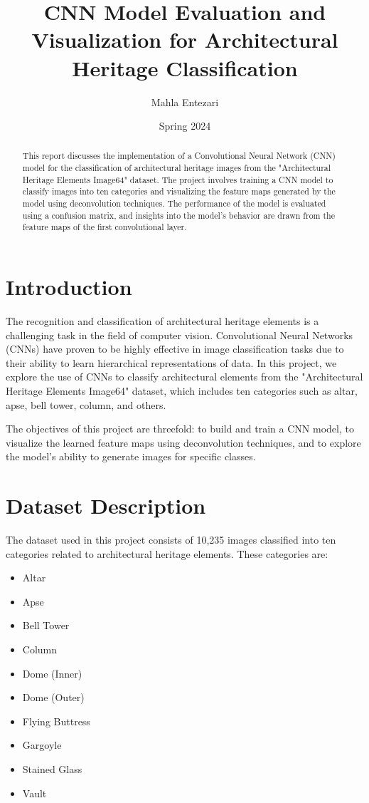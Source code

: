 \documentclass[12pt]{article}
\title{CNN Model Evaluation and Visualization for Architectural Heritage Classification}
\author{Mahla Entezari}
\date{Spring 2024}
\begin{document}
\maketitle

\begin{abstract}
This report discusses the implementation of a Convolutional Neural Network (CNN) model for the classification of architectural heritage images from the "Architectural Heritage Elements Image64" dataset. The project involves training a CNN model to classify images into ten categories and visualizing the feature maps generated by the model using deconvolution techniques. The performance of the model is evaluated using a confusion matrix, and insights into the model's behavior are drawn from the feature maps of the first convolutional layer.
\end{abstract}

\section{Introduction}
The recognition and classification of architectural heritage elements is a challenging task in the field of computer vision. Convolutional Neural Networks (CNNs) have proven to be highly effective in image classification tasks due to their ability to learn hierarchical representations of data. In this project, we explore the use of CNNs to classify architectural elements from the "Architectural Heritage Elements Image64" dataset, which includes ten categories such as altar, apse, bell tower, column, and others.

The objectives of this project are threefold: to build and train a CNN model, to visualize the learned feature maps using deconvolution techniques, and to explore the model's ability to generate images for specific classes.

\section{Dataset Description}
The dataset used in this project consists of 10,235 images classified into ten categories related to architectural heritage elements. These categories are:

\begin{itemize}
    \item Altar
    \item Apse
    \item Bell Tower
    \item Column
    \item Dome (Inner)
    \item Dome (Outer)
    \item Flying Buttress
    \item Gargoyle
    \item Stained Glass
    \item Vault
\end{itemize}
\end{document}
